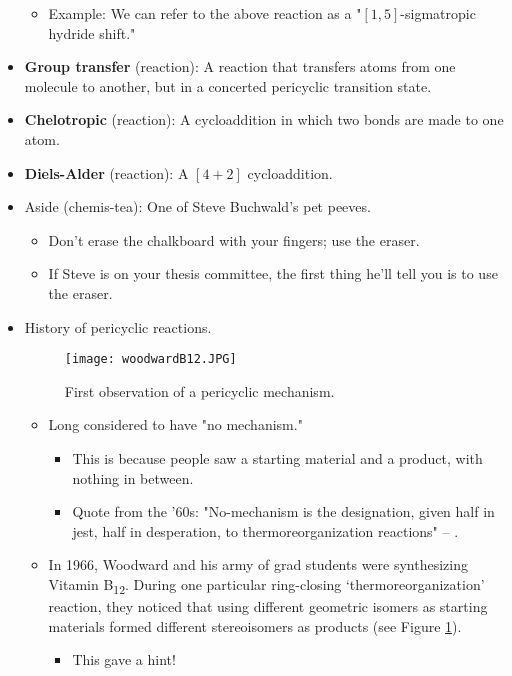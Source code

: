 \documentclass[../notes.tex]{subfiles}
\begin{document}
\begin{itemize}
\begin{itemize}
        \item Example: We can refer to the above reaction as a "$[1,5]$-sigmatropic hydride shift."
    \end{itemize}
    \item \textbf{Group transfer} (reaction): A reaction that transfers atoms from one molecule to another, but in a concerted pericyclic transition state.
    \item \textbf{Chelotropic} (reaction): A cycloaddition in which two bonds are made to one atom.
    \item \textbf{Diels-Alder} (reaction): A $[4+2]$ cycloaddition.
    \item Aside (chemis-tea): One of Steve Buchwald's pet peeves.
    \begin{itemize}
        \item Don't erase the chalkboard with your fingers; use the eraser.
        \item If Steve is on your thesis committee, the first thing he'll tell you is to use the eraser.
    \end{itemize}
    \item History of pericyclic reactions.
    \begin{figure}[h!]
        \centering
        \texttt{[image: woodwardB12.JPG]}
        \caption{First observation of a pericyclic mechanism.}
        \label{fig:woodwardB12}
    \end{figure}
    \begin{itemize}
        \item Long considered to have "no mechanism."
        \begin{itemize}
            \item This is because people saw a starting material and a product, with nothing in between.
            \item Quote from the '60s: "No-mechanism is the designation, given half in jest, half in desperation, to thermoreorganization reactions" -- \textcite{bib:thermoReorg}.
        \end{itemize}
        \item In 1966, Woodward and his army of grad students were synthesizing Vitamin B\textsubscript{12}. During one particular ring-closing `thermoreorganization' reaction, they noticed that using different geometric isomers as starting materials formed different stereoisomers as products (see Figure \ref{fig:woodwardB12}).
        \begin{itemize}
            \item This gave a hint!

\end{itemize}
\end{itemize}
\end{itemize}
\end{document}
